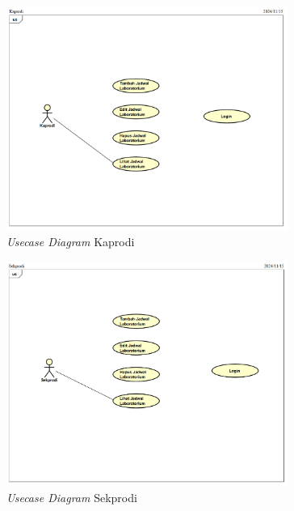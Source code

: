 \begin{figure}
	\centering
	\includegraphics[width=0.82\textwidth]{konten/gambar/usecase-diagram/kaprodi.png}
	\caption{\textit{Usecase Diagram} Kaprodi}
	\label{usecase-diagram-kaprodi}
\end{figure}

\begin{figure}
	\centering
	\includegraphics[width=0.82\textwidth]{konten/gambar/usecase-diagram/sekprodi.png}
	\caption{\textit{Usecase Diagram} Sekprodi}
	\label{usecase-diagram-sekprodi}
\end{figure}

